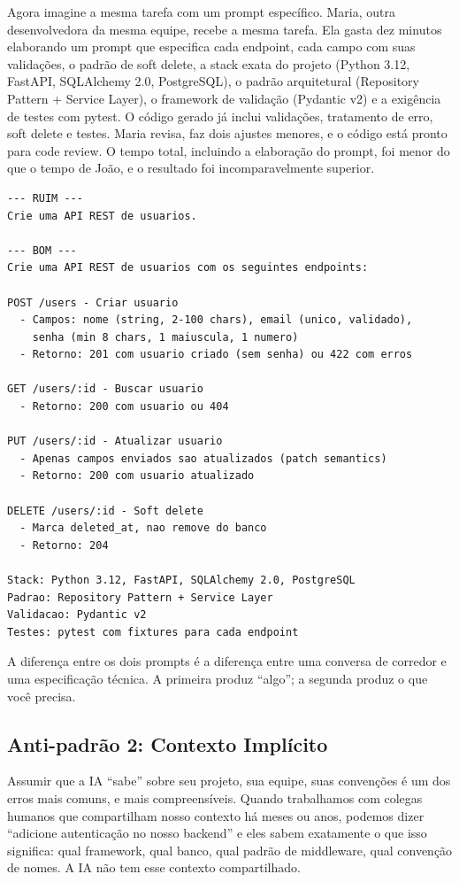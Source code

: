 Agora imagine a mesma tarefa com um prompt específico. Maria, outra desenvolvedora
da mesma equipe, recebe a mesma tarefa. Ela gasta dez minutos elaborando um
prompt que especifica cada endpoint, cada campo com suas validações, o padrão de
soft delete, a stack exata do projeto (Python 3.12, FastAPI, SQLAlchemy 2.0,
PostgreSQL), o padrão arquitetural (Repository Pattern + Service Layer), o
framework de validação (Pydantic v2) e a exigência de testes com pytest. O
código gerado já inclui validações, tratamento de erro, soft delete e testes.
Maria revisa, faz dois ajustes menores, e o código está pronto para code review.
O tempo total, incluindo a elaboração do prompt, foi menor do que o tempo de
João, e o resultado foi incomparavelmente superior.

\begin{lstlisting}[language={}, caption={Anti-padrão: prompt vago vs. prompt específico}]
--- RUIM ---
Crie uma API REST de usuarios.

--- BOM ---
Crie uma API REST de usuarios com os seguintes endpoints:

POST /users - Criar usuario
  - Campos: nome (string, 2-100 chars), email (unico, validado),
    senha (min 8 chars, 1 maiuscula, 1 numero)
  - Retorno: 201 com usuario criado (sem senha) ou 422 com erros

GET /users/:id - Buscar usuario
  - Retorno: 200 com usuario ou 404

PUT /users/:id - Atualizar usuario
  - Apenas campos enviados sao atualizados (patch semantics)
  - Retorno: 200 com usuario atualizado

DELETE /users/:id - Soft delete
  - Marca deleted_at, nao remove do banco
  - Retorno: 204

Stack: Python 3.12, FastAPI, SQLAlchemy 2.0, PostgreSQL
Padrao: Repository Pattern + Service Layer
Validacao: Pydantic v2
Testes: pytest com fixtures para cada endpoint
\end{lstlisting}

A diferença entre os dois prompts é a diferença entre uma conversa de corredor e
uma especificação técnica. A primeira produz ``algo''; a segunda produz o que
você precisa.

\subsection{Anti-padrão 2: Contexto Implícito}

Assumir que a IA ``sabe'' sobre seu projeto, sua equipe, suas convenções é um
dos erros mais comuns, e mais compreensíveis. Quando trabalhamos com colegas
humanos que compartilham nosso contexto há meses ou anos, podemos dizer ``adicione
autenticação no nosso backend'' e eles sabem exatamente o que isso significa:
qual framework, qual banco, qual padrão de middleware, qual convenção de nomes. A
IA não tem esse contexto compartilhado.

